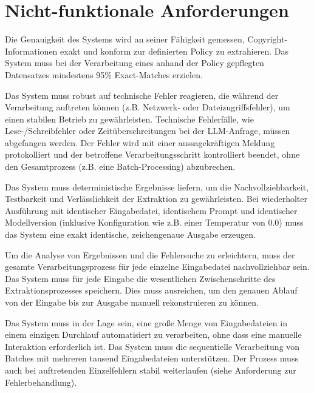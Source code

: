 \section{Nicht-funktionale Anforderungen}\label{sec:nicht-funktionale-anforderungen}

\begin{anforderungsliste}
        {Die Genauigkeit des Systems wird an seiner Fähigkeit gemessen, Copyright-Informationen exakt und konform zur definierten Policy zu extrahieren.}
        {Das System muss bei der Verarbeitung eines anhand der Policy gepflegten Datensatzes mindestens 95\% Exact-Matches erzielen.}

        {Das System muss robust auf technische Fehler reagieren, die während der Verarbeitung auftreten können (z.B. Netzwerk- oder Dateizugriffsfehler), um einen stabilen Betrieb zu gewährleisten.}
        {Technische Fehlerfälle, wie Lese-/Schreibfehler oder Zeitüberschreitungen bei der LLM-Anfrage, müssen abgefangen werden. Der Fehler wird mit einer aussagekräftigen Meldung protokolliert und der betroffene Verarbeitungsschritt kontrolliert beendet, ohne den Gesamtprozess (z.B. eine Batch-Processing) abzubrechen.}

        {Das System muss deterministische Ergebnisse liefern, um die Nachvollziehbarkeit, Testbarkeit und Verlässlichkeit der Extraktion zu gewährleisten.}
        {Bei wiederholter Ausführung mit identischer Eingabedatei, identischem Prompt und identischer Modellversion (inklusive Konfiguration wie z.B. einer Temperatur von 0.0) muss das System eine exakt identische, zeichengenaue Ausgabe erzeugen.}

        {Um die Analyse von Ergebnissen und die Fehlersuche zu erleichtern, muss der gesamte Verarbeitungsprozess für jede einzelne Eingabedatei nachvollziehbar sein.}
        {Das System muss für jede Eingabe die wesentlichen Zwischenschritte des Extraktionsprozesses speichern. Dies muss ausreichen, um den genauen Ablauf von der Eingabe bis zur Ausgabe manuell rekonstruieren zu können.}

        {Das System muss in der Lage sein, eine große Menge von Eingabedateien in einem einzigen Durchlauf automatisiert zu verarbeiten, ohne dass eine manuelle Interaktion erforderlich ist.}
        {Das System muss die sequentielle Verarbeitung von Batches mit mehreren tausend Eingabedateien unterstützen. Der Prozess muss auch bei auftretenden Einzelfehlern stabil weiterlaufen (siehe Anforderung zur Fehlerbehandlung).}


\end{anforderungsliste}
